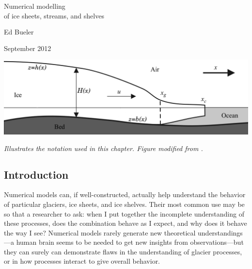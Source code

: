 \documentclass[titlepage,letterpaper,final,12pt]{scrartcl}
\begin{document}
\graphicspath{{../photos/}{../pdffigs/}}


\begin{titlepage}

  \begin{center}
    {\Large{} Numerical modelling \\ of ice sheets, streams, and shelves}
    \vspace{0.5cm}

    {\large Ed Bueler}
    \vspace{1cm}

    September 2012

    \vfill
    
    \includegraphics[width=6.0in]{flowline}
  
    \scriptsize \emph{Illustrates the notation used in this chapter.  Figure modified from \cite{SchoofMarine1}.} \normalsize
    
    \vspace{2.0in}
  \end{center}
\end{titlepage}


\setcounter{section}{1}
\subsection{Introduction}

Numerical models can, if well-constructed, actually help understand the behavior of particular glaciers, ice sheets, and ice shelves.  Their most common use may be so that a researcher to ask: when I put together the incomplete understanding of these processes, does the combination behave as I expect, and why does it behave the way I see?  Numerical models rarely generate new theoretical understandings---a human brain seems to be needed to get new insights from observations---but they can surely can demonstrate flaws in the understanding of glacier processes, or in how processes interact to give overall behavior.
\end{document}
